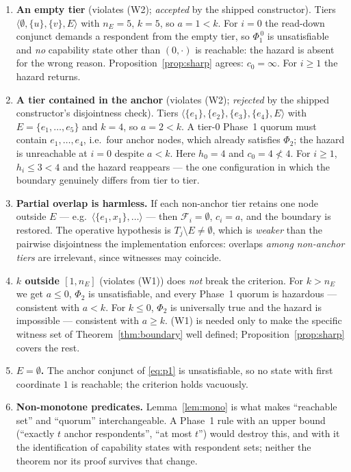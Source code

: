 \begin{enumerate}
\item \textbf{An empty tier} (violates (W2); \emph{accepted} by the shipped
  constructor).  Tiers $\langle\emptyset,\{u\},\{v\},E\rangle$ with
  $n_E=5$, $k=5$, so $a=1<k$.  For $i=0$ the read-down conjunct demands a
  respondent from the empty tier, so $\Phi_1^{\,0}$ is unsatisfiable and
  \emph{no} capability state other than $(0,\cdot)$ is reachable: the hazard
  is absent for the wrong reason.  Proposition~\ref{prop:sharp} agrees:
  $c_0=\infty$.  For $i\ge1$ the hazard returns.
\item \textbf{A tier contained in the anchor} (violates (W2); \emph{rejected}
  by the shipped constructor's disjointness check).  Tiers
  $\langle\{e_1\},\{e_2\},\{e_3\},\{e_4\},E\rangle$ with
  $E=\{e_1,\dots,e_5\}$ and $k=4$, so $a=2<k$.  A tier-$0$ Phase~1 quorum
  must contain $e_1,\dots,e_4$, i.e.\ four anchor nodes, which already
  satisfies $\Phi_2$; the hazard is unreachable at $i=0$ despite $a<k$.
  Here $h_0=4$ and $c_0=4\not<4$.  For $i\ge1$, $h_i\le3<4$ and the hazard
  reappears --- the one configuration in which the boundary genuinely
  differs from tier to tier.
\item \textbf{Partial overlap is harmless.}  If each non-anchor tier retains
  one node outside $E$ --- e.g.\ $\langle\{e_1,x_1\},\dots\rangle$ --- then
  $\mathcal F_i=\emptyset$, $c_i=a$, and the boundary is restored.  The
  operative hypothesis is $T_j\setminus E\neq\emptyset$, which is
  \emph{weaker} than the pairwise disjointness the implementation enforces:
  overlaps \emph{among non-anchor tiers} are irrelevant, since witnesses may
  coincide.
\item \textbf{$k$ outside $[1,n_E]$} (violates (W1)) does \emph{not} break the
  criterion.  For $k>n_E$ we get $a\le0$, $\Phi_2$ is unsatisfiable, and every
  Phase~1 quorum is hazardous --- consistent with $a<k$.  For $k\le0$,
  $\Phi_2$ is universally true and the hazard is impossible --- consistent
  with $a\ge k$.  (W1) is needed only to make the specific witness set of
  Theorem~\ref{thm:boundary} well defined;
  Proposition~\ref{prop:sharp} covers the rest.
\item \textbf{$E=\emptyset$.}  The anchor conjunct of \eqref{eq:p1} is
  unsatisfiable, so no state with first coordinate $1$ is reachable; the
  criterion holds vacuously.
\item \textbf{Non-monotone predicates.}  Lemma~\ref{lem:mono} is what makes
  ``reachable set'' and ``quorum'' interchangeable.  A Phase~1 rule with an
  upper bound (``exactly $t$ anchor respondents'', ``at most $t$'') would
  destroy this, and with it the identification of capability states with
  respondent sets; neither the theorem nor its proof survives that change.
\end{enumerate}

